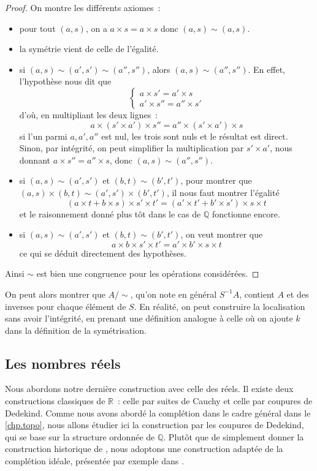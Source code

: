 \begin{proof}
  On montre les différents axiomes~:
  \begin{itemize}
  \item pour tout $(a,s)$, on a $a\times s = a \times s$ donc $(a,s)\sim(a,s)$.
  \item la symétrie vient de celle de l'égalité.
  \item si $(a,s)\sim(a',s')\sim(a'',s'')$, alors $(a,s)\sim(a'',s'')$. En
    effet, l'hypothèse nous dit que
    \[\left\{\begin{array}{l}
    a \times s' = a' \times s\\
    a' \times s'' = a'' \times s'
    \end{array}\right.\]
    d'où, en multipliant les deux lignes~:
    \[a\times (s'\times a') \times s'' = a''\times (s'\times a') \times s\]
    si l'un parmi $a,a',a''$ est nul, les trois sont nuls et le résultat est
    direct. Sinon, par intégrité, on peut simplifier la multiplication par
    $s'\times a'$, nous donnant $a\times s'' = a'' \times s$, donc
    $(a,s) \sim (a'',s'')$.
  \item si $(a,s)\sim(a',s')$ et $(b,t)\sim(b',t')$, pour montrer que
    $(a,s)\times(b,t)\sim (a',s')\times (b',t')$, il nous faut montrer
    l'égalité
    \[(a\times t + b \times s)\times s' \times t' =
    (a'\times t' + b' \times s')\times s \times t\]
    et le raisonnement donné plus tôt dans le cas de $\mathbb Q$ fonctionne
    encore.
  \item si $(a,s)\sim(a',s')$ et $(b,t)\sim(b',t')$, on veut montrer que
    \[a\times b \times s' \times t' = a' \times b' \times s \times t\]
    ce qui se déduit directement des hypothèses.
  \end{itemize}
  Ainsi $\sim$ est bien une congruence pour les opérations considérées.
\end{proof}

On peut alors montrer que $A/\sim$, qu'on note en général $S^{-1}A$, contient
$A$ et des inverses pour chaque élément de $S$. En réalité, on peut construire
la localisation sans avoir l'intégrité, en prenant une définition analogue à
celle où on ajoute $k$ dans la définition de la symétrisation.

\subsection{Les nombres réels}

Nous abordons notre dernière construction avec celle des réels. Il existe deux
constructions classiques de $\mathbb R$~: celle par suites de Cauchy et celle
par coupures de Dedekind. Comme nous avons abordé la complétion dans le cadre
général dans le \cref{chp.topo}, nous allons étudier ici la construction par
les coupures de Dedekind, qui se base sur la structure ordonnée de $\mathbb Q$.
Plutôt que de simplement donner la construction historique de \cite{DedekindCut},
nous adoptons une construction adaptée de la complétion
idéale, présentée par exemple dans \cite{DBLP:books/daglib/0093287}.

